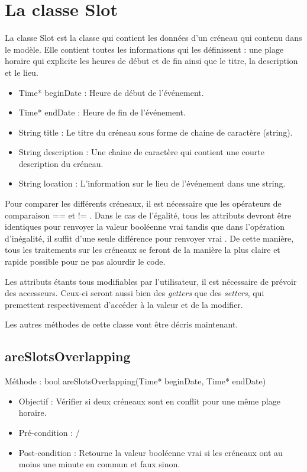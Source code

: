 	\section{La classe Slot}    
	La classe Slot est la classe qui contient les données d'un créneau qui contenu dans le modèle. Elle contient toutes les informations qui les définissent : une plage horaire qui explicite les heures de début et de fin ainsi que le titre, la description et le lieu. 
	\begin{itemize}
		\item Time* beginDate : Heure de début de l'événement.
		\item Time* endDate : Heure de fin de l'événement.
		\item String title : Le titre du créneau sous forme de chaine de caractère (string).
		\item String description : Une chaine de caractère qui contient une courte description du créneau.
		\item String location : L'information sur le lieu de l'événement dans une string.
	\end{itemize}
	
	Pour comparer les différents créneaux, il est nécessaire que les opérateurs de comparaison \og == \fg{}  et \og != \fg{}. Dans le cas de l'égalité, tous les attributs devront être identiques pour renvoyer la valeur booléenne \og vrai \fg{} tandis que dans l'opération d'inégalité, il suffit d'une seule différence pour renvoyer \og vrai \fg{}. De cette manière, tous les traitements sur les créneaux se feront de la manière la plus claire et rapide possible pour ne pas alourdir le code.
	
	Les attributs étants tous modifiables par l'utilisateur, il est nécessaire de prévoir des accesseurs. Ceux-ci seront aussi bien des \textit{getters} que des \textit{setters}, qui premettent respectivement d'accéder à la valeur et de la modifier.
	
	Les autres méthodes de cette classe vont être décris maintenant.
   		\subsection*{areSlotsOverlapping}
            Méthode : bool areSlotsOverlapping(Time* beginDate, Time* endDate)
			\begin{itemize}
				\item Objectif  : Vérifier si deux créneaux sont en conflit pour une même plage horaire.
				\item Pré-condition : /
				\item Post-condition : Retourne la valeur booléenne \og vrai \fg{} si les créneaux ont au moins une minute en commun et faux sinon.
			\end{itemize}

